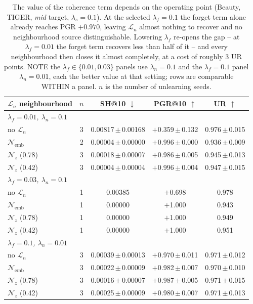 \begin{table}[t]
\centering
\small
\caption{The value of the coherence term depends on the operating point (Beauty, TIGER, \emph{mid} target, $\lambda_s{=}0.1$). At the selected $\lambda_f{=}0.1$ the forget term alone already reaches PGR $+0.970$, leaving $\mathcal{L}_n$ almost nothing to recover and no neighbourhood source distinguishable. Lowering $\lambda_f$ re-opens the gap -- at $\lambda_f{=}0.01$ the forget term recovers less than half of it -- and every neighbourhood then closes it almost completely, at a cost of roughly 3 UR points. NOTE the $\lambda_f{\in}\{0.01,0.03\}$ panels use $\lambda_n{=}0.1$ and the $\lambda_f{=}0.1$ panel $\lambda_n{=}0.01$, each the better value at that setting; rows are comparable WITHIN a panel. $n$ is the number of unlearning seeds.}
\label{tab:latent-headroom}
\begin{tabular}{lcccc}
\toprule
$\mathcal{L}_n$ neighbourhood & $n$ & SH@10 $\downarrow$ & PGR@10 $\uparrow$ & UR $\uparrow$ \\
\midrule
\multicolumn{5}{l}{\textit{$\lambda_f=0.01$, $\lambda_n=0.1$}} \\
no $\mathcal{L}_n$ & 3 & 0.00817\,$\pm$\,0.00168 & $+$0.359\,$\pm$\,0.132 & 0.976\,$\pm$\,0.015 \\
$\mathcal{N}_{\text{emb}}$ & 2 & 0.00004\,$\pm$\,0.00000 & $+$0.996\,$\pm$\,0.000 & 0.936\,$\pm$\,0.009 \\
$\mathcal{N}_z$ (0.78) & 3 & 0.00018\,$\pm$\,0.00007 & $+$0.986\,$\pm$\,0.005 & 0.945\,$\pm$\,0.013 \\
$\mathcal{N}_z$ (0.42) & 3 & 0.00004\,$\pm$\,0.00004 & $+$0.996\,$\pm$\,0.004 & 0.947\,$\pm$\,0.015 \\
\midrule
\multicolumn{5}{l}{\textit{$\lambda_f=0.03$, $\lambda_n=0.1$}} \\
no $\mathcal{L}_n$ & 1 & 0.00385 & $+$0.698 & 0.978 \\
$\mathcal{N}_{\text{emb}}$ & 1 & 0.00000 & $+$1.000 & 0.943 \\
$\mathcal{N}_z$ (0.78) & 1 & 0.00000 & $+$1.000 & 0.949 \\
$\mathcal{N}_z$ (0.42) & 1 & 0.00000 & $+$1.000 & 0.951 \\
\midrule
\multicolumn{5}{l}{\textit{$\lambda_f=0.1$, $\lambda_n=0.01$}} \\
no $\mathcal{L}_n$ & 3 & 0.00039\,$\pm$\,0.00013 & $+$0.970\,$\pm$\,0.011 & 0.971\,$\pm$\,0.012 \\
$\mathcal{N}_{\text{emb}}$ & 3 & 0.00022\,$\pm$\,0.00009 & $+$0.982\,$\pm$\,0.007 & 0.970\,$\pm$\,0.010 \\
$\mathcal{N}_z$ (0.78) & 3 & 0.00016\,$\pm$\,0.00007 & $+$0.987\,$\pm$\,0.005 & 0.971\,$\pm$\,0.015 \\
$\mathcal{N}_z$ (0.42) & 3 & 0.00025\,$\pm$\,0.00009 & $+$0.980\,$\pm$\,0.007 & 0.971\,$\pm$\,0.013 \\
\bottomrule
\end{tabular}
\end{table}
